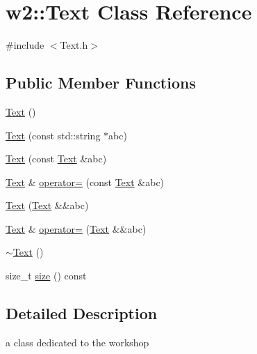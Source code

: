 \hypertarget{classw2_1_1Text}{\section{w2\-:\-:Text Class Reference}
\label{classw2_1_1Text}
}


{\ttfamily \#include $<$Text.\-h$>$}

\subsection*{Public Member Functions}
\begin{DoxyCompactItemize}
\item 
\hyperlink{classw2_1_1Text_ae1f84aff73ffeb21de94b898fdc65147}{Text} ()
\item 
\hyperlink{classw2_1_1Text_a58a5917b75c0217d9a51ace4efb7f08f}{Text} (const std\-::string $\ast$abc)
\item 
\hyperlink{classw2_1_1Text_ae9a6634d5722fc1a82d32754661d372c}{Text} (const \hyperlink{classw2_1_1Text}{Text} \&abc)
\item 
\hyperlink{classw2_1_1Text}{Text} \& \hyperlink{classw2_1_1Text_afd6e2206e60b4b603278b71828eb64bb}{operator=} (const \hyperlink{classw2_1_1Text}{Text} \&abc)
\item 
\hyperlink{classw2_1_1Text_acc0b3560c2bb656e7ae8fa7ddfd480a3}{Text} (\hyperlink{classw2_1_1Text}{Text} \&\&abc)
\item 
\hyperlink{classw2_1_1Text}{Text} \& \hyperlink{classw2_1_1Text_ad0e0547b179de989940d1e591c3b1aee}{operator=} (\hyperlink{classw2_1_1Text}{Text} \&\&abc)
\item 
\hyperlink{classw2_1_1Text_a803254d0b1ee4f61831f575a4f8e76f9}{$\sim$\-Text} ()
\item 
size\-\_\-t \hyperlink{classw2_1_1Text_a8a433c5fddab3b4ee369035699b034ea}{size} () const 
\end{DoxyCompactItemize}


\subsection{Detailed Description}
a class dedicated to the workshop 

